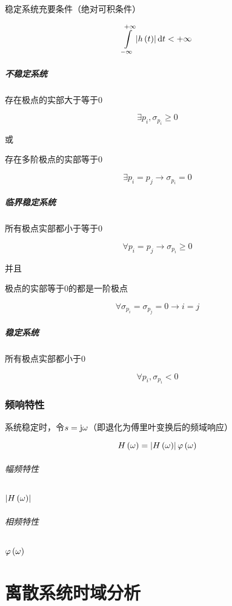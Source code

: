 \documentclass{article}
\begin{document}
稳定系统充要条件（绝对可积条件）

\[\impint\abs{h\p{t}}\d t<+\infty\]

\subsubsection{不稳定系统}

存在极点的实部大于等于0

\[\exists p_i,\sigma_{p_i}\geqslant0\]

或

存在多阶极点的实部等于0

\[\exists p_i=p_j\to\sigma_{p_i}=0\]

\subsubsection{临界稳定系统}

所有极点实部都小于等于0

\[\forall p_i=p_j\to\sigma_{p_i}\geqslant0\]

并且

极点的实部等于0的都是一阶极点

\[\forall\sigma_{p_i}=\sigma_{p_j}=0\to i=j\]

\subsubsection{稳定系统}

所有极点实部都小于0

\[\forall p_i,\sigma_{p_i}<0\]

\section{频响特性}

系统稳定时，令$s=\mathrm j\omega$（即退化为傅里叶变换后的频域响应）

\[H\left(\omega\right)=\left|H\left(\omega\right)\right|\varphi\left(\omega\right)\]

\paragraph{幅频特性}$\left|H\left(\omega\right)\right|$

\paragraph{相频特性}$\varphi\left(\omega\right)$

\part{离散系统时域分析}
\end{document}
